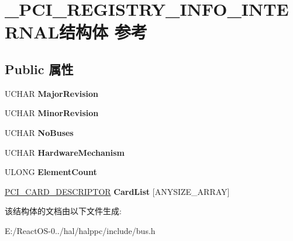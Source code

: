 \hypertarget{struct___p_c_i___r_e_g_i_s_t_r_y___i_n_f_o___i_n_t_e_r_n_a_l}{}\section{\+\_\+\+P\+C\+I\+\_\+\+R\+E\+G\+I\+S\+T\+R\+Y\+\_\+\+I\+N\+F\+O\+\_\+\+I\+N\+T\+E\+R\+N\+A\+L结构体 参考}
\label{struct___p_c_i___r_e_g_i_s_t_r_y___i_n_f_o___i_n_t_e_r_n_a_l}
\subsection*{Public 属性}
\begin{DoxyCompactItemize}
\item 
\mbox{\label{struct___p_c_i___r_e_g_i_s_t_r_y___i_n_f_o___i_n_t_e_r_n_a_l_a760a048defedc7b1baabe53f7a11c829}} 
U\+C\+H\+AR {\bfseries Major\+Revision}
\item 
\mbox{\label{struct___p_c_i___r_e_g_i_s_t_r_y___i_n_f_o___i_n_t_e_r_n_a_l_aa3d57199389c4dba05a46804c1ce077c}} 
U\+C\+H\+AR {\bfseries Minor\+Revision}
\item 
\mbox{\label{struct___p_c_i___r_e_g_i_s_t_r_y___i_n_f_o___i_n_t_e_r_n_a_l_a7ff0ab2807292db6d880ddf6b6096098}} 
U\+C\+H\+AR {\bfseries No\+Buses}
\item 
\mbox{\label{struct___p_c_i___r_e_g_i_s_t_r_y___i_n_f_o___i_n_t_e_r_n_a_l_a373f074f2de93e76d9bcd79148c26461}} 
U\+C\+H\+AR {\bfseries Hardware\+Mechanism}
\item 
\mbox{\label{struct___p_c_i___r_e_g_i_s_t_r_y___i_n_f_o___i_n_t_e_r_n_a_l_aa31930d5b057a3147a319f55097dc68d}} 
U\+L\+O\+NG {\bfseries Element\+Count}
\item 
\mbox{\label{struct___p_c_i___r_e_g_i_s_t_r_y___i_n_f_o___i_n_t_e_r_n_a_l_a7dd56afbf5a0f69b6259db4e939c076e}} 
\hyperlink{struct___p_c_i___c_a_r_d___d_e_s_c_r_i_p_t_o_r}{P\+C\+I\+\_\+\+C\+A\+R\+D\+\_\+\+D\+E\+S\+C\+R\+I\+P\+T\+OR} {\bfseries Card\+List} \mbox{[}A\+N\+Y\+S\+I\+Z\+E\+\_\+\+A\+R\+R\+AY\mbox{]}
\end{DoxyCompactItemize}


该结构体的文档由以下文件生成\+:\begin{DoxyCompactItemize}
\item 
E\+:/\+React\+O\+S-\/0../hal/halppc/include/bus.\+h\end{DoxyCompactItemize}
